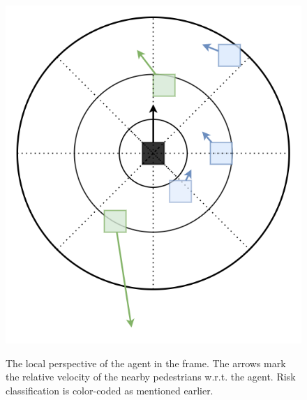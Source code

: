 \begin{figure}[!htbp]
		\centering
		\includegraphics[width=\textwidth]{figures/agent_perspective_recreated.png}
		\label{fig:agent-perspective_agent-perspective}
		\caption{The local perspective of the agent in the frame. The arrows mark the relative velocity of the nearby pedestrians w.r.t. the agent. Risk classification is color-coded as mentioned earlier.}
\end{figure}





